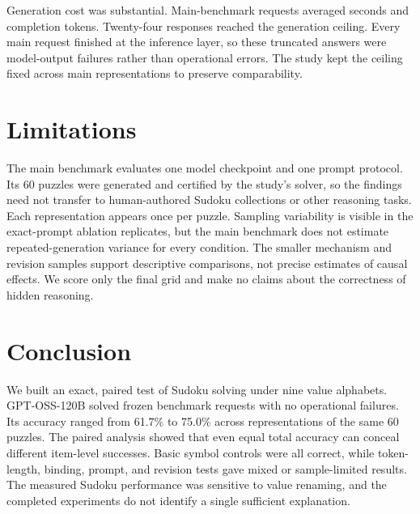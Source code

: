 \documentclass[11pt,a4paper]{article}
\begin{document}
Generation cost was substantial. Main-benchmark requests averaged \MainMeanLatency{} seconds and \MainMeanTokens{} completion tokens. Twenty-four responses reached the generation ceiling. Every main request finished at the inference layer, so these truncated answers were model-output failures rather than operational errors. The study kept the ceiling fixed across main representations to preserve comparability.

\section{Limitations}
The main benchmark evaluates one model checkpoint and one prompt protocol. Its 60 puzzles were generated and certified by the study's solver, so the findings need not transfer to human-authored Sudoku collections or other reasoning tasks. Each representation appears once per puzzle. Sampling variability is visible in the exact-prompt ablation replicates, but the main benchmark does not estimate repeated-generation variance for every condition. The smaller mechanism and revision samples support descriptive comparisons, not precise estimates of causal effects. We score only the final grid and make no claims about the correctness of hidden reasoning.

\section{Conclusion}
We built an exact, paired test of Sudoku solving under nine value alphabets. GPT-OSS-120B solved \MainCorrect{} frozen benchmark requests with no operational failures. Its accuracy ranged from 61.7\% to 75.0\% across representations of the same 60 puzzles. The paired analysis showed that even equal total accuracy can conceal different item-level successes. Basic symbol controls were all correct, while token-length, binding, prompt, and revision tests gave mixed or sample-limited results. The measured Sudoku performance was sensitive to value renaming, and the completed experiments do not identify a single sufficient explanation.

\begingroup
\small
\setlength{\bibsep}{2pt}


\endgroup
\end{document}
